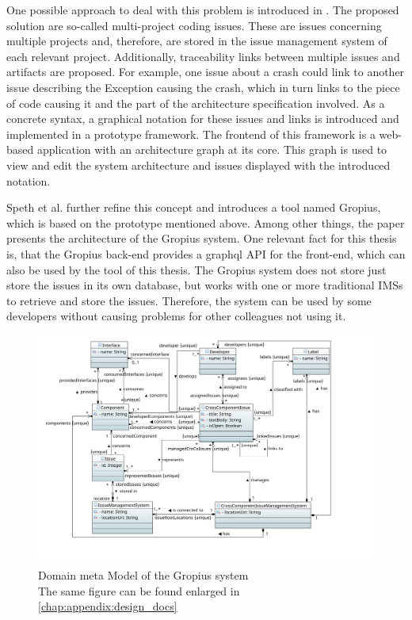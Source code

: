 One possible approach to deal with this problem is introduced in \cite{Speth2019}.
The proposed solution are so-called multi-project coding issues. These are issues concerning multiple projects and, therefore, are stored in the issue management system of each relevant project. 
Additionally, traceability links between multiple issues and artifacts are proposed. 
For example, one issue about a crash could link to another issue describing the Exception causing the crash, which in turn links to the piece of code causing it and the part of the architecture specification involved.
As a concrete syntax, a graphical notation for these issues and links is introduced and implemented in a prototype framework. The frontend of this framework is a web-based application with an architecture graph at its core.
This graph is used to view and edit the system architecture and issues displayed with the introduced notation. 

Speth et al. \cite{speth2020gropius} further refine this concept and introduces a tool named \gls{Gropius}, which is  based on the prototype mentioned above.
Among other things, the paper presents the architecture of the \gls{Gropius} system. 
One relevant fact for this thesis is, that the \gls{Gropius} back-end provides a \gls{graphql} \gls{API} for the front-end,
which can also be used by the tool of this thesis.
The \gls{Gropius} system does not store just store the issues in its own database, but works with one or more traditional \glspl{IMS} to retrieve and store the issues.
Therefore, the system can be used by some developers without causing problems for other colleagues not using it.

\begin{figure}[!h]
	\centering
	\includegraphics[width=\textwidth]{graphics/domainMetaModel.png}
	\caption{Domain meta Model of the \gls{Gropius} system \\ \footnotesize{The same figure can be found enlarged in \cref{chap:appendix:design_docs}}}
	\label{fig:c2:domain_meta_model}
\end{figure}

